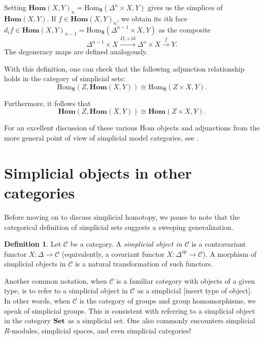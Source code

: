 \documentclass[12pt]{article}
\theoremstyle{plain}
\theoremstyle{definition}
\newtheorem{definition}[theorem]{Definition}
\newcommand{\mbf}[1]{\mathbf{#1}}
\newcommand{\Hom}{\text{Hom}}
\newcommand{\Homs}{\textbf{Hom}}
\newcommand{\Set}{\text{\textbf{Set}}}
\newcommand{\Cat}{\mathcal{C}}
\begin{document}
Setting $\Homs(X,Y)_n= \Hom_{\mbf S}(\Delta^n\times X,Y)$ gives us the simplices of $\Homs(X,Y)$. If $f\in \Homs(X,Y)_n$, we obtain its $i$th face $d_if\in \Homs(X,Y)_{n-1}= \Hom_{\mbf S}(\Delta^{n-1}\times X,Y)$ as the composite $$\Delta^{n-1}\times X\xrightarrow{D_i\times \text{id}}\Delta^{n}\times X\xrightarrow{f}Y.$$ The degeneracy maps are defined analogously. 

With this definition, one can check that the following adjunction relationship holds in the category of simplicial sets:
$$\Hom_{\mbf S}(Z,\Homs(X,Y))\cong \Hom_{\mbf S}(Z\times X,Y).$$

Furthermore, it follows that $$\Homs(Z,\Homs(X,Y))\cong \Homs(Z\times X,Y).$$

For an excellent discussion of these various $\Hom$ objects and adjunctions from the more general point of view of simplicial model categories, see \cite[Section II.2]{GoeJar}.



\section{Simplicial objects in other categories}\label{S: simplicial cats}


Before moving on to discuss simplicial homotopy, we pause to note that the categorical definition of simplicial sets suggests a sweeping generalization.

\begin{definition}
Let $\Cat$ be a category. A \emph{simplicial object in $\Cat$} 
is a contravariant functor $X\colon \Delta\to \Cat$ (equivalently, a covariant functor $X\colon  \Delta^{op}\to \Cat$). A morphism of simplicial objects in $\Cat$ is a natural transformation of such functors.
\end{definition}


Another common notation, when $\Cat$ is a familiar category with objects of a given type, is to refer to a simplicial object in $\Cat$ as a simplicial [insert type of object]. In other words, when $\Cat$ is the category of groups and group homomorphisms, we speak of simplicial groups. This is consistent with referring to a simplicial object in the category $\Set$ as a simplicial set. One also commonly encounters simplicial $R$-modules, simplicial spaces, and even simplicial categories!
\end{document}
